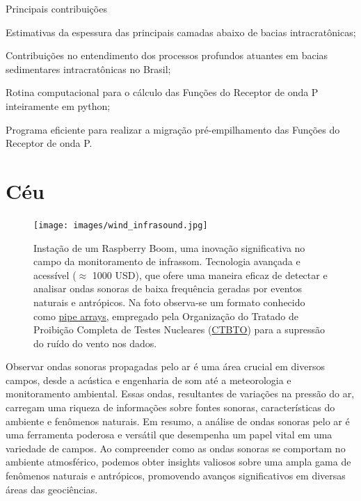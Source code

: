 \documentclass[10pt,a4paper,oneside]{book}
\newcommand{\HeroFigPad}{\vspace{-1cm}}
\begin{document}
\begin{fancyenum}{\faCogs}{Principais contribuições}
	\item Estimativas da espessura das principais camadas abaixo de bacias intracratônicas;
	\item Contribuições no entendimento dos processos profundos atuantes em bacias sedimentares intracratônicas no Brasil;
	\item Rotina computacional para o cálculo das Funções do Receptor de onda P inteiramente em python;
	\item Programa eficiente para realizar a migração pré-empilhamento das Funções do Receptor de onda P.
\end{fancyenum}

\chapter{Céu}
\label{cap_ceu}

\begin{figure}[h]
	\HeroFigPad
	\begin{center}
		\texttt{[image: images/wind\_infrasound.jpg]}
	\end{center}
	\caption{
	Instação de um Raspberry Boom, uma inovação significativa no campo da monitoramento de infrassom. Tecnologia avançada e acessível ($\approx$ 1000 USD), que ofere uma maneira eficaz de detectar e analisar ondas sonoras de baixa frequência geradas por eventos naturais e antrópicos. Na foto observa-se um formato conhecido como \href{https://www.ctbto.org/our-work/monitoring-technologies/infrasound-monitoring}{pipe arrays}, empregado pela Organização do Tratado de Proibição Completa de Testes Nucleares (\href{https://www.ctbto.org/}{CTBTO}) para a supressão do ruído do vento nos dados.
    }
 \label{fig_wind}
\end{figure}

Observar ondas sonoras propagadas pelo ar é uma área crucial em diversos campos, desde a acústica e engenharia de som até a meteorologia e monitoramento ambiental. Essas ondas, resultantes de variações na pressão do ar, carregam uma riqueza de informações sobre fontes sonoras, características do ambiente e fenômenos naturais. Em resumo, a análise de ondas sonoras pelo ar é uma ferramenta poderosa e versátil que desempenha um papel vital em uma variedade de campos. Ao compreender como as ondas sonoras se comportam no ambiente atmosférico, podemos obter insights valiosos sobre uma ampla gama de fenômenos naturais e antrópicos, promovendo avanços significativos em diversas áreas das geociências.
\end{document}
